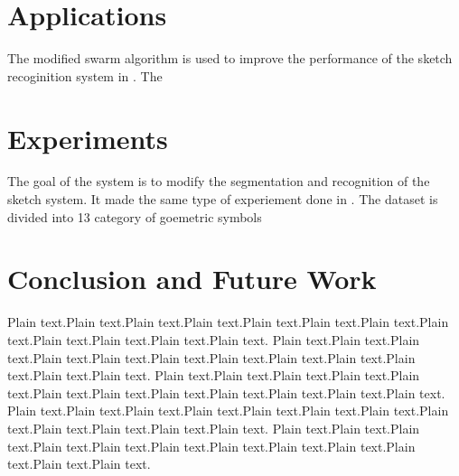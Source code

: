\documentclass[10pt]{article}
\begin{document}
\section{Applications }
The modified swarm algorithm is used to improve the performance of the sketch recoginition system in \cite{myPaper}. The 

\cite{myPaper}  
\section{Experiments} 
 The goal of the system is to modify the segmentation and recognition of the sketch system. It made the same type of experiement done in \cite{myPaper}. The dataset is divided into 13 category of goemetric symbols 
\section{Conclusion and Future Work}
Plain text.Plain text.Plain text.Plain text.Plain text.Plain text.Plain text.Plain text.Plain text.Plain text.Plain text.Plain text.
Plain text.Plain text.Plain text.Plain text.Plain text.Plain text.Plain text.Plain text.Plain text.Plain text.Plain text.Plain text.
Plain text.Plain text.Plain text.Plain text.Plain text.Plain text.Plain text.Plain text.Plain text.Plain text.Plain text.Plain text.
Plain text.Plain text.Plain text.Plain text.Plain text.Plain text.Plain text.Plain text.Plain text.Plain text.Plain text.Plain text.
Plain text.Plain text.Plain text.Plain text.Plain text.Plain text.Plain text.Plain text.Plain text.Plain text.Plain text.Plain text.



\end{document}
